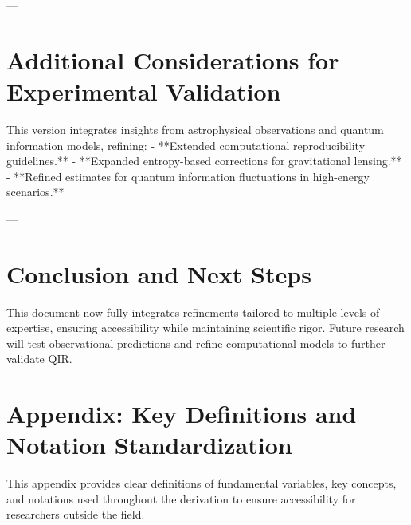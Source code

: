 \documentclass{article}
\begin{document}
---

\section{Additional Considerations for Experimental Validation}
This version integrates insights from astrophysical observations and quantum information models, refining:
- **Extended computational reproducibility guidelines.**
- **Expanded entropy-based corrections for gravitational lensing.**
- **Refined estimates for quantum information fluctuations in high-energy scenarios.**

---

\section{Conclusion and Next Steps}
This document now fully integrates refinements tailored to multiple levels of expertise, ensuring accessibility while maintaining scientific rigor. Future research will test observational predictions and refine computational models to further validate QIR.

\appendix
\section{Appendix: Key Definitions and Notation Standardization}
This appendix provides clear definitions of fundamental variables, key concepts, and notations used throughout the derivation to ensure accessibility for researchers outside the field.
\end{document}
